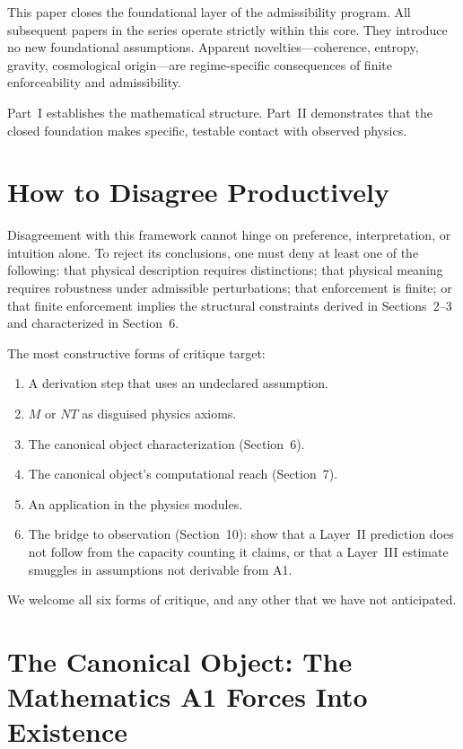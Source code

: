 \documentclass[11pt]{article}
\begin{document}
This paper closes the foundational layer of the admissibility program.  All subsequent papers in the series operate strictly within this core.  They introduce no new foundational assumptions.  Apparent novelties---coherence, entropy, gravity, cosmological origin---are regime-specific consequences of finite enforceability and admissibility.

Part~I establishes the mathematical structure.  Part~II demonstrates that the closed foundation makes specific, testable contact with observed physics.


\section{How to Disagree Productively}

Disagreement with this framework cannot hinge on preference, interpretation, or intuition alone.  To reject its conclusions, one must deny at least one of the following: that physical description requires distinctions; that physical meaning requires robustness under admissible perturbations; that enforcement is finite; or that finite enforcement implies the structural constraints derived in Sections~2--3 and characterized in Section~6.

The most constructive forms of critique target:

\begin{enumerate}[label=(\alph*),nosep]
\item A derivation step that uses an undeclared assumption.
\item $M$ or $NT$ as disguised physics axioms.
\item The canonical object characterization (Section~6).
\item The canonical object's computational reach (Section~7).
\item An application in the physics modules.
\item The bridge to observation (Section~10): show that a Layer~II prediction does not follow from the capacity counting it claims, or that a Layer~III estimate smuggles in assumptions not derivable from A1.
\end{enumerate}

We welcome all six forms of critique, and any other that we have not anticipated.


\section{The Canonical Object: The Mathematics A1 Forces Into Existence}
\end{document}
